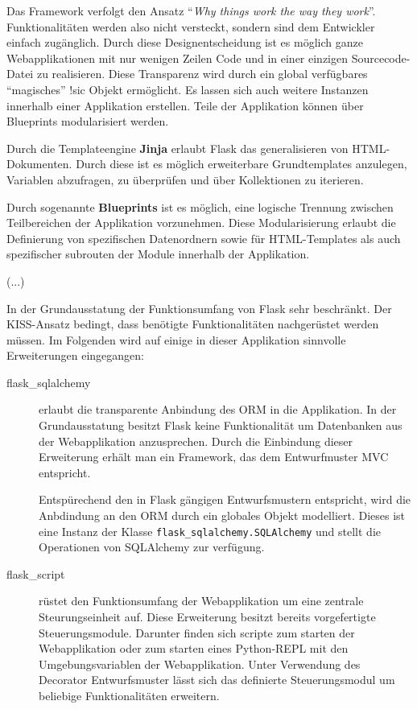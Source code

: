    Das Framework verfolgt den Ansatz "`\textit{Why things work the way they work}"'. Funktionalitäten werden also nicht versteckt, sondern sind dem Entwickler einfach zugänglich. Durch diese Designentscheidung ist es möglich ganze Webapplikationen mit nur wenigen Zeilen Code und in einer einzigen Sourcecode-Datei zu realisieren. Diese Transparenz wird durch ein global verfügbares "`magisches"' !sic Objekt ermöglicht. 
    Es lassen sich auch weitere Instanzen innerhalb einer Applikation erstellen. 
    Teile der Applikation können über Blueprints modularisiert werden.
    
   Durch die Templateengine \textbf{Jinja} erlaubt Flask das generalisieren von HTML-Dokumenten. Durch diese ist es möglich erweiterbare Grundtemplates anzulegen, Variablen abzufragen, zu überprüfen und über Kollektionen zu iterieren.
   

   
  Durch sogenannte \textbf{Blueprints} ist es möglich, eine logische Trennung zwischen Teilbereichen der Applikation vorzunehmen. Diese Modularisierung erlaubt die Definierung von spezifischen Datenordnern sowie für HTML-Templates als auch spezifischer subrouten der Module innerhalb der Applikation.
  
  (...)
  

  In der Grundausstatung der Funktionsumfang von Flask sehr beschränkt. Der KISS-Ansatz bedingt, dass benötigte Funktionalitäten nachgerüstet werden müssen. Im Folgenden wird auf einige in dieser Applikation sinnvolle Erweiterungen eingegangen:
  
  \begin{description}
   \item [flask\_sqlalchemy] erlaubt die transparente Anbindung des ORM in die Applikation. In der Grundausstatung besitzt Flask keine Funktionalität um Datenbanken aus der Webapplikation anzusprechen. Durch die Einbindung dieser Erweiterung erhält man ein Framework, das dem Entwurfmuster MVC entspricht.
   
   Entspürechend den in Flask gängigen Entwurfsmustern entspricht, wird die Anbdindung an den ORM durch ein globales Objekt modelliert. Dieses ist eine Instanz der Klasse \texttt{flask\_sqlalchemy.SQLAlchemy} und stellt die Operationen von SQLAlchemy zur verfügung.
   
   \item [flask\_script] rüstet den Funktionsumfang der Webapplikation um eine zentrale Steurungseinheit auf. Diese Erweiterung besitzt bereits vorgefertigte Steuerungsmodule. Darunter finden sich scripte  zum starten der Webapplikation oder zum starten eines Python-REPL mit den Umgebungsvariablen der Webapplikation. Unter Verwendung des Decorator Entwurfsmuster lässt sich das definierte Steuerungsmodul um beliebige Funktionalitäten erweitern.
   
  \end{description}

